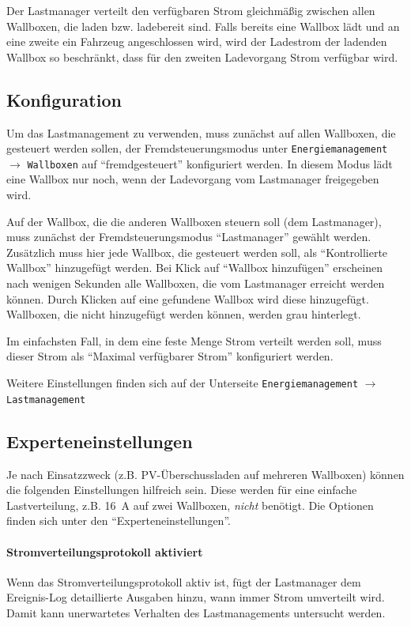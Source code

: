 \documentclass[a4paper,10pt]{article}
\begin{document}
\begin{multicols*}{2}
    Der Lastmanager verteilt den verfügbaren Strom gleichmäßig zwischen allen Wallboxen, die laden bzw. ladebereit sind.
    Falls bereits eine Wallbox lädt und an eine zweite ein Fahrzeug angeschlossen wird,
    wird der Ladestrom der ladenden Wallbox so beschränkt, dass für den zweiten Ladevorgang Strom verfügbar wird.

    \subsection{Konfiguration}
    Um das Lastmanagement zu verwenden, muss zunächst auf allen Wallboxen, die gesteuert werden sollen,
    der Fremdsteuerungsmodus unter \texttt{Energiemanagement} $\rightarrow$ \texttt{Wallboxen} auf \enquote{fremdgesteuert} konfiguriert werden.
    In diesem Modus lädt eine Wallbox nur noch, wenn der Ladevorgang vom Lastmanager freigegeben wird.

    Auf der Wallbox, die die anderen Wallboxen steuern soll (dem Lastmanager), muss zunächst der Fremdsteuerungsmodus \enquote{Lastmanager} gewählt werden.
    Zusätzlich muss hier jede Wallbox, die gesteuert werden soll, als \enquote{Kontrollierte Wallbox} hinzugefügt werden.
    Bei Klick auf \enquote{Wallbox hinzufügen} erscheinen nach wenigen Sekunden alle Wallboxen, die vom Lastmanager erreicht werden können.
    Durch Klicken auf eine gefundene Wallbox wird diese hinzugefügt. Wallboxen, die nicht hinzugefügt werden können, werden grau hinterlegt.

    Im einfachsten Fall, in dem eine feste Menge Strom verteilt werden soll, muss dieser
    Strom als \enquote{Maximal verfügbarer Strom} konfiguriert werden.

    Weitere Einstellungen finden sich auf der Unterseite \texttt{Energiemanagement} $\rightarrow$ \texttt{Lastmanagement}

    \subsection{Experteneinstellungen}
    Je nach Einsatzzweck (z.B. PV-Überschussladen auf mehreren Wallboxen) können die folgenden Einstellungen hilfreich sein.
    Diese werden für eine einfache Lastverteilung, z.B. \SI{16}{\ampere} auf zwei Wallboxen, \textit{nicht} benötigt.
    Die Optionen finden sich unter den \enquote{Experteneinstellungen}.

    \vspace{-0.2cm}
    \paragraph{Stromverteilungsprotokoll aktiviert}
    Wenn das Stromverteilungsprotokoll aktiv ist, fügt der Lastmanager dem Ereignis-Log detaillierte Ausgaben hinzu, wann immer Strom umverteilt wird. Damit kann unerwartetes Verhalten des
    Lastmanagements untersucht werden.


\end{multicols*}
\end{document}
